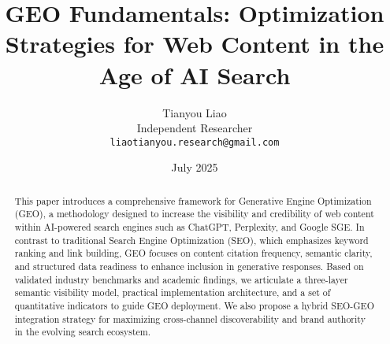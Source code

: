 \documentclass[11pt]{article}
\title{GEO Fundamentals: Optimization Strategies for Web Content in the Age of AI Search}
\author{Tianyou Liao \\ Independent Researcher \\ \texttt{liaotianyou.research@gmail.com}}
\date{July 2025}
\begin{document}
\maketitle

\begin{abstract}
This paper introduces a comprehensive framework for Generative Engine Optimization (GEO), a methodology designed to increase the visibility and credibility of web content within AI-powered search engines such as ChatGPT, Perplexity, and Google SGE. In contrast to traditional Search Engine Optimization (SEO), which emphasizes keyword ranking and link building, GEO focuses on content citation frequency, semantic clarity, and structured data readiness to enhance inclusion in generative responses. Based on validated industry benchmarks and academic findings, we articulate a three-layer semantic visibility model, practical implementation architecture, and a set of quantitative indicators to guide GEO deployment. We also propose a hybrid SEO-GEO integration strategy for maximizing cross-channel discoverability and brand authority in the evolving search ecosystem.
\end{abstract}













\end{document}
